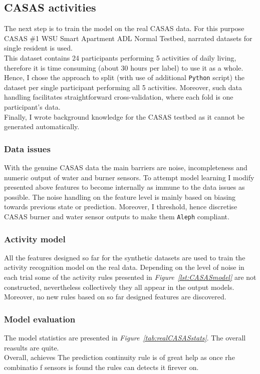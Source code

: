 \documentclass[10pt, a4paper, pdflatex, leqno, twoside, openright]{report}
\begin{document}
    \subsection{CASAS activities}
The next step is to train the model on the real CASAS data. For this purpose CASAS \#1 WSU Smart Apartment ADL Normal Testbed, narrated datasets for single resident is used.\\
This dataset contains 24 participants performing 5 activities of daily living, therefore it is time consuming (about 30 hours per label) to use it as a whole. Hence, I chose the approach to split (with use of additional \texttt{Python} script) the dataset per single participant performing all 5 activities. Moreover, such data handling facilitates straightforward cross-validation, where each fold is one participant's data.\\
Finally, I wrote background knowledge for the CASAS testbed as it cannot be generated automatically.

      \subsubsection{Data issues}
With the genuine CASAS data the main barriers are noise, incompleteness and numeric output of water and burner sensors. To attempt model learning I modify presented above features to become internally as immune to the data issues as possible. The noise handling on the feature level is mainly based on biasing towards previous state or prediction. Moreover, I threshold, hence discretise CASAS burner and water sensor outputs to make them \texttt{Aleph} compliant.

      \subsubsection{Activity model}
All the features designed so far for the synthetic datasets are used to train the activity recognition model on the real data. Depending on the level of noise in each trial some of the activity rules presented in \emph{Figure~\ref{lst:CASASmodel}} are not constructed, nevertheless collectively they all appear in the output models. Moreover, no new rules based on so far designed features are discovered.

      \subsubsection{Model evaluation}
The model statistics are presented in \emph{Figure~\ref{tab:realCASASstats}}. The overall reasults are quite.\\
Overall, achieves
The prediction continuity rule is of great help as once rhe combinatio f sensors is found the rules can detects it firever on.
\end{document}
